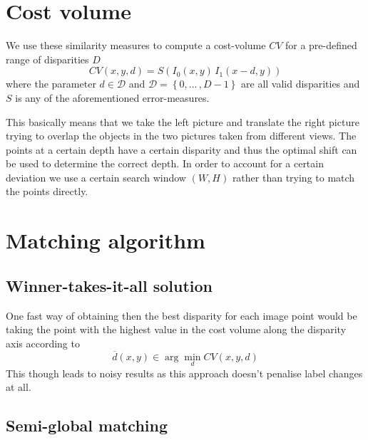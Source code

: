 \documentclass{article}
\begin{document}
\section{Cost volume}
We use these similarity measures to compute a cost-volume $CV$ for a pre-defined range of disparities $D$
\begin{equation}
CV(x,y,d) = S(I_0(x,y) \, I_1(x - d,y) )
\end{equation}
where the parameter $d \in \mathcal{D}$ and $\mathcal{D} = \left\{ 0, ... \, , D-1 \right\}$ are all valid disparities and $S$ is any of the aforementioned error-measures.

This basically means that we take the left picture and translate the right picture trying to overlap the objects in the two pictures taken from different views. The points at a certain depth have a certain disparity and thus the optimal shift can be used to determine the correct depth. In order to account for a certain deviation we use a certain search window $(W,H)$ rather than trying to match the points directly.

\section{Matching algorithm}

\subsection{Winner-takes-it-all solution}
One fast way of obtaining then the best disparity for each image point would be taking the point with the highest value in the cost volume along the disparity axis according to
\begin{equation}
\overline{d}(x,y) \in \arg \min_d CV(x,y,d)
\end{equation}
This though leads to noisy results as this approach doesn't penalise label changes at all.

\subsection{Semi-global matching}
\end{document}
